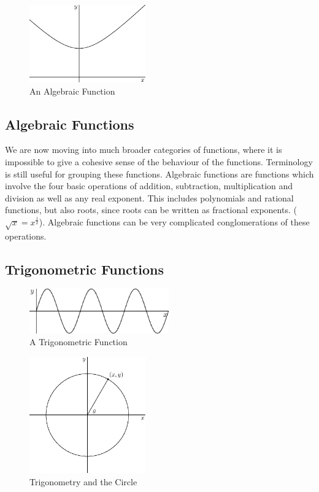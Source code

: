 \documentclass[fleqn]{report}
\begin{document}
\begin{figure}[t]
\centering
\includegraphics[width=5cm]{figure30.eps}
\caption{An Algebraic Function}
\label{figure-algebraic-function}
\end{figure}

\subsection{Algebraic Functions} 
\label{algebraic-functions}

We are now moving into much broader categories of functions,
where it is impossible to give a cohesive sense of the
behaviour of the functions. Terminology is still useful for
grouping these functions. Algebraic functions are
functions which involve the four basic operations of addition,
subtraction, multiplication and division as well as any real
exponent. This includes polynomials and rational functions,
but also roots, since roots can be written as fractional
exponents. ($\sqrt{x} = x^{\frac{1}{2}}$). Algebraic
functions can be very complicated conglomerations of these
operations. 

\subsection{Trigonometric Functions}
\label{trig-functions}

\begin{figure}[t]
\centering
\includegraphics[width=6cm]{figure32.eps}
\caption{A Trigonometric Function}
\label{figure-trigonometric-function}
\end{figure}

\begin{figure}[t]
\centering
\includegraphics[width=5cm]{figure34.eps}
\caption{Trigonometry and the Circle}
\label{figure-trig-circle}
\end{figure}
\end{document}
